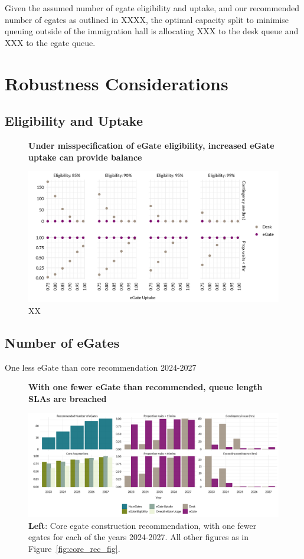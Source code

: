 \documentclass[10pt]{article}
\newcommand*{\figuretitle}[1]{%
    {\centering%
    \textbf{#1}%
    \par\medskip}%
}
\begin{document}
Given the assumed number of \gls{egate} eligibility and uptake, and our recommended number of \glspl{egate} as outlined in XXXX, the optimal capacity split to minimise queuing outside of the immigration hall is allocating XXX to the desk queue and XXX to the \gls{egate} queue.
 

\section{Robustness Considerations} \label{sec:robustness}

\subsection{Eligibility and Uptake}

\begin{figure}[!ht]
    \centering
    \figuretitle{Under misspecification of eGate eligibility, increased eGate uptake can provide balance}
    \includegraphics[width=\textwidth]{figures/robustness_fig.png}
     \caption{XX} \label{fig:robustness_fig}
\end{figure}

\subsection{Number of eGates}
One less eGate than core recommendation 2024-2027
\begin{figure}[!ht]
    \centering
    \figuretitle{With one fewer eGate than recommended, queue length SLAs are breached}
    \includegraphics[width=\textwidth]{figures/minus_core_rec_fig.png}
     \caption{\textbf{Left}: Core \gls{egate} construction recommendation, with one fewer \glspl{egate} for each of the years 2024-2027. All other figures as in Figure~\ref{fig:core_rec_fig}.} \label{fig:minus_core_rec_fig}
\end{figure}
\end{document}

